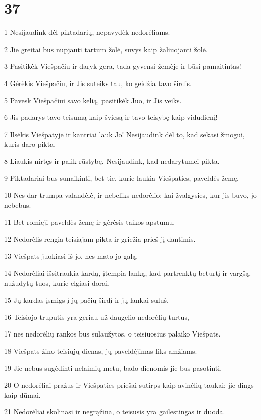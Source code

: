 \chapter{37}


\par 1 Nesijaudink dėl piktadarių, nepavydėk nedorėliams. 
\par 2 Jie greitai bus nupjauti tartum žolė, suvys kaip žaliuojanti žolė. 
\par 3 Pasitikėk Viešpačiu ir daryk gera, tada gyvensi žemėje ir būsi pamaitintas! 
\par 4 Gėrėkis Viešpačiu, ir Jis suteiks tau, ko geidžia tavo širdis. 
\par 5 Pavesk Viešpačiui savo kelią, pasitikėk Juo, ir Jis veiks. 
\par 6 Jis padarys tavo teisumą kaip šviesą ir tavo teisybę kaip vidudienį! 
\par 7 Ilsėkis Viešpatyje ir kantriai lauk Jo! Nesijaudink dėl to, kad sekasi žmogui, kuris daro pikta. 
\par 8 Liaukis nirtęs ir palik rūstybę. Nesijaudink, kad nedarytumei pikta. 
\par 9 Piktadariai bus sunaikinti, bet tie, kurie laukia Viešpaties, paveldės žemę. 
\par 10 Nes dar trumpa valandėlė, ir nebeliks nedorėlio; kai žvalgysies, kur jis buvo, jo nebebus. 
\par 11 Bet romieji paveldės žemę ir gėrėsis taikos apstumu. 
\par 12 Nedorėlis rengia teisiajam pikta ir griežia prieš jį dantimis. 
\par 13 Viešpats juokiasi iš jo, nes mato jo galą. 
\par 14 Nedorėliai išsitraukia kardą, įtempia lanką, kad partrenktų beturtį ir vargšą, nužudytų tuos, kurie elgiasi dorai. 
\par 15 Jų kardas įsmigs į jų pačių širdį ir jų lankai suluš. 
\par 16 Teisiojo truputis yra geriau už daugelio nedorėlių turtus, 
\par 17 nes nedorėlių rankos bus sulaužytos, o teisiuosius palaiko Viešpats. 
\par 18 Viešpats žino teisiųjų dienas, jų paveldėjimas liks amžiams. 
\par 19 Jie nebus sugėdinti nelaimių metu, bado dienomis jie bus pasotinti. 
\par 20 O nedorėliai pražus ir Viešpaties priešai sutirps kaip avinėlių taukai; jie dings kaip dūmai. 
\par 21 Nedorėliai skolinasi ir negrąžina, o teisusis yra gailestingas ir duoda. 
